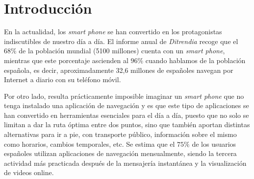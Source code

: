 \chapter{Introducción}
\label{cap:introduccion}




	

En la actualidad, los \textit{smart phone} se han convertido en los protagonistas indiscutibles de nuestro día a día. El informe anual de \textit{Ditrendia} recoge que el $68\%$ de la población mundial (5100 millones) cuenta con un \textit{smart phone}, mientras que este porcentaje ascienden al $96\%$ cuando hablamos de la población española, es decir, aproximadamente 32,6 millones de españoles navegan por Internet a diario con su teléfono móvil. 

Por otro lado, resulta prácticamente imposible imaginar un \textit{smart phone} que no tenga instalado una aplicación de navegación y es que este tipo de aplicaciones se han convertido en herramientas esenciales para el día a día, puesto que no solo se limitan a dar la ruta óptima entre dos puntos, sino que también aportan distintas alternativas para ir a pie, con transporte público, información sobre el mismo como horarios, cambios temporales, etc. Se estima que el $75\%$ de los usuarios españoles utilizan aplicaciones de navegación mensualmente, siendo la tercera actividad más practicada después de la mensajería instantánea y la visualización de videos online.

